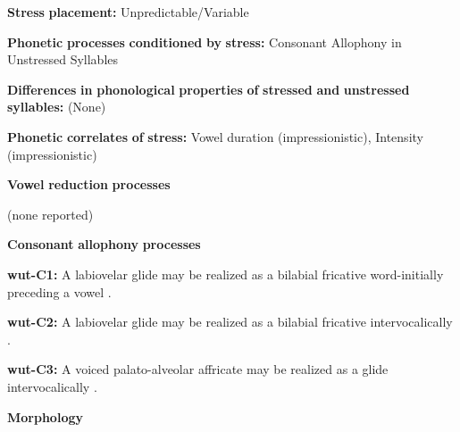 \documentclass[output=paper]{langsci/langscibook}
\begin{document}
\begin{styleBody}
\textbf{Stress} \textbf{placement:} Unpredictable/Variable
\end{styleBody}

\begin{styleBody}
\textbf{Phonetic} \textbf{processes} \textbf{conditioned} \textbf{by} \textbf{stress:} Consonant Allophony in Unstressed Syllables
\end{styleBody}

\begin{styleBody}
\textbf{Differences} \textbf{in} \textbf{phonological} \textbf{properties} \textbf{of} \textbf{stressed} \textbf{and} \textbf{unstressed} \textbf{syllables:} (None)
\end{styleBody}

\begin{styleBody}
\textbf{Phonetic} \textbf{correlates} \textbf{of} \textbf{stress:} Vowel duration (impressionistic), Intensity (impressionistic)
\end{styleBody}

\begin{styleBody}
\textbf{Vowel} \textbf{reduction} \textbf{processes}
\end{styleBody}

\begin{styleBody}
(none reported)
\end{styleBody}

\begin{styleBody}
\textbf{Consonant} \textbf{allophony} \textbf{processes}
\end{styleBody}

\begin{styleBody}
\textbf{wut-C1:} A labiovelar glide may be realized as a bilabial fricative word-initially preceding a vowel \citep[57-8]{Marmion2010}.
\end{styleBody}

\begin{styleBody}
\textbf{wut-C2:} A labiovelar glide may be realized as a bilabial fricative intervocalically \citep[57-8]{Marmion2010}.
\end{styleBody}

\begin{styleBody}
\textbf{wut-C3:} A voiced palato-alveolar affricate may be realized as a glide intervocalically \citep[55]{Marmion2010}.
\end{styleBody}

\begin{styleBody}
\textbf{Morphology}
\end{styleBody}
\end{document}

